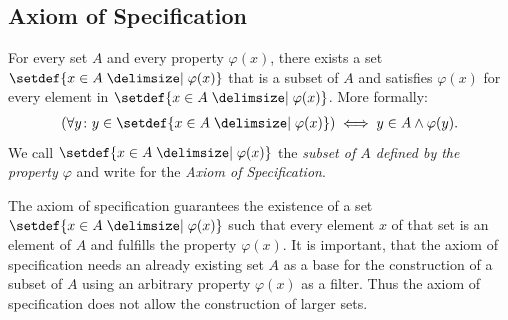 \subsection{Axiom of Specification}

\begin{axiom}[Specification]
    For every set $A$ and every property $\varphi(x)$, there exists a set $\setdef{x\in A\given\varphi(x)}$ that is a subset of $A$ and satisfies $\varphi(x)$ for every element in $\setdef{x\in A\given\varphi(x)}$. More formally:
    \begin{align}(\forall y\colon y\in\setdef{x\in A\given\varphi(x)})\iff y\in A\land \varphi(y).\end{align}
    We call $\setdef{x\in A\given\varphi(x)}$ the \emph{subset of $A$ defined by the property $\varphi$} and write  for the \emph{Axiom of Specification}.
\end{axiom}

The axiom of specification guarantees the existence of a set $\setdef{x\in A\given\varphi(x)}$ such that every element $x$ of that set is an element of $A$ and fulfills the property $\varphi(x)$. It is important, that the axiom of specification needs an already existing set $A$ as a base for the construction of a subset of $A$ using an arbitrary property $\varphi(x)$ as a filter. Thus the axiom of specification does not allow the construction of larger sets.

